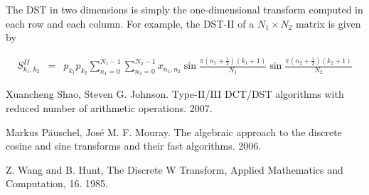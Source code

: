 \documentclass[12pt]{article}
\begin{document}
The DST in two dimensions is simply the one-dimensional transform computed in each row and each column. For example, the DST-II of a $N_1\times N_2$ matrix is given by

\begin{eqnarray*}
S^{II}_{k_1,k_2}&=&p_{k_1}p_{k_2}\sum _{n_1=0}^{N_1-1}\sum _{n_2=0}^{N_2-1} x_{n_1,n_2} \sin \frac{\pi \left(n_1+\frac{1}{2}\right) (k_1+1)}{N_1} \sin \frac{\pi \left(n_2+\frac{1}{2}\right) (k_2+1)}{N_2}
\end{eqnarray*}

\begin{thebibliography}{3}

 Xuancheng Shao, Steven G. Johnson. Type-II/III DCT/DST algorithms with reduced number of arithmetic operations. 2007.

 Markus P\"auschel, Jos\'e M. F. Mouray. The algebraic approach to the discrete cosine and
sine transforms and their fast algorithms. 2006.

 Z. Wang and B. Hunt, The Discrete W Transform, Applied Mathematics and Computation,
16. 1985.

\end{thebibliography}
\end{document}

